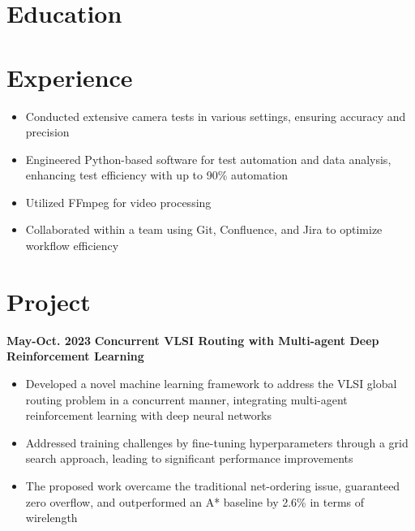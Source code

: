 \documentclass[11pt,a4paper,sans]{moderncv}
\begin{document}
\makecvtitle

\section{Education}

\section{Experience}
{
    \begin{itemize}
    \item Conducted extensive camera tests in various settings, ensuring accuracy and precision
    \item Engineered Python-based software for test automation and data analysis, enhancing test efficiency with up to 90\% automation
    \item Utilized FFmpeg for video processing
    \item Collaborated within a team using Git, Confluence, and Jira to optimize workflow efficiency
    \end{itemize}
}

\section{Project}

\cventry
{\textnormal{\textbf{May-Oct. 2023}}}
{\textnormal{\textbf{Concurrent VLSI Routing with Multi-agent
Deep Reinforcement Learning}}}
{}{}{}
{
    \begin{itemize}
        \item Developed a novel machine learning framework to address the VLSI global routing problem in a concurrent manner, integrating multi-agent reinforcement learning with deep neural networks
        \item Addressed training challenges by fine-tuning hyperparameters through a grid search approach, leading to significant performance improvements
        \item The proposed work overcame the traditional net-ordering issue, guaranteed zero overflow, and outperformed an A* baseline by 2.6\% in terms of wirelength
        \end{itemize}
}
\end{document}
